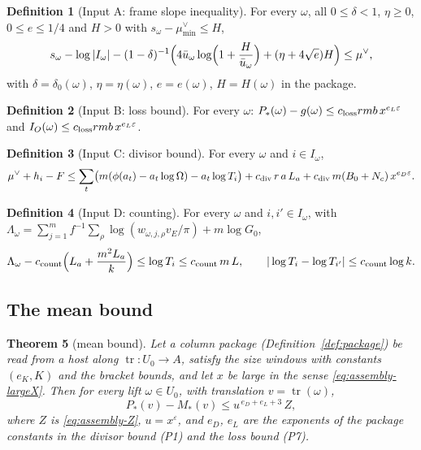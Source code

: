 \documentclass[10pt]{amsart}
\newtheorem{theorem}{Theorem}[section]
\theoremstyle{definition}
\newtheorem{definition}[theorem]{Definition}
\theoremstyle{remark}
\begin{document}
\begin{definition}[Input A: frame slope inequality]\label{inp:F}
For every $\omega$, all $0\le\delta<1$, $\eta\ge0$, $0\le e\le1/4$ and
$H>0$ with $s_\omega-\mu^\vee_{\min}\le H$,
\[
 s_\omega-\log|I_\omega|-(1-\delta)^{-1}
 \Bigl(4\bar u_\omega\log\Bigl(1+\frac H{\bar u_\omega}\Bigr)+(\eta+4\sqrt e)H\Bigr)\le\mu^\vee ,
\]
with $\delta=\delta_0(\omega)$, $\eta=\eta(\omega)$, $e=e(\omega)$, $H=H(\omega)$
in the package.
\end{definition}

\begin{definition}[Input B: loss bound]\label{inp:loss}
For every $\omega$: $P_*(\omega)-g(\omega)\le c_{\rm loss}rmb\,x^{e_L\varepsilon}$
and $I_O(\omega)\le c_{\rm loss}rmb\,x^{e_L\varepsilon}$.
\end{definition}

\begin{definition}[Input C: divisor bound]\label{inp:div}
For every $\omega$ and $i\in I_\omega$,
\[
 \mu^\vee+h_i-F\le\sum_t\bigl(m(\phi(a_t)-a_t\log\Omega)-a_t\log T_i\bigr)
 +c_{\rm div}\,r\,a\,L_a+c_{\rm div}\,m(B_0+N_c)\,x^{e_D\varepsilon}.
\]
\end{definition}

\begin{definition}[Input D: counting]\label{inp:count}
For every $\omega$ and $i,i'\in I_\omega$, with
$\Lambda_\omega=\sum_{j=1}^m f^{-1}\sum_\rho\log(w_{\omega,j,\rho}v_E/\pi)+m\log G_0$,
\[
 \Lambda_\omega-c_{\rm count}\Bigl(L_a+\frac{m^2L_a}k\Bigr)\le\log T_i\le c_{\rm count}\,m\,L,
 \qquad |\log T_i-\log T_{i'}|\le c_{\rm count}\log k .
\]
\end{definition}




\subsection{The mean bound}\label{subsec:assembly-T5}

\begin{theorem}[mean bound]\label{thm:mean-bound}
Let a column package (Definition~\ref{def:package}) be read from a host along
$\operatorname{tr}:U_0\to A$, satisfy the size windows with constants
$(e_K,K)$ and the bracket bounds, and let $x$ be large in the sense
\eqref{eq:assembly-largeX}. Then for every lift $\omega\in U_0$, with
translation $v=\operatorname{tr}(\omega)$,
\[
 P_*(v)-M_*(v)\le u^{\,e_D+e_L+3}\,Z ,
\]
where $Z$ is \eqref{eq:assembly-Z}, $u=x^\varepsilon$, and $e_D$, $e_L$ are the
exponents of the package constants in the divisor bound (P1) and the loss bound (P7).
\end{theorem}
\end{document}
